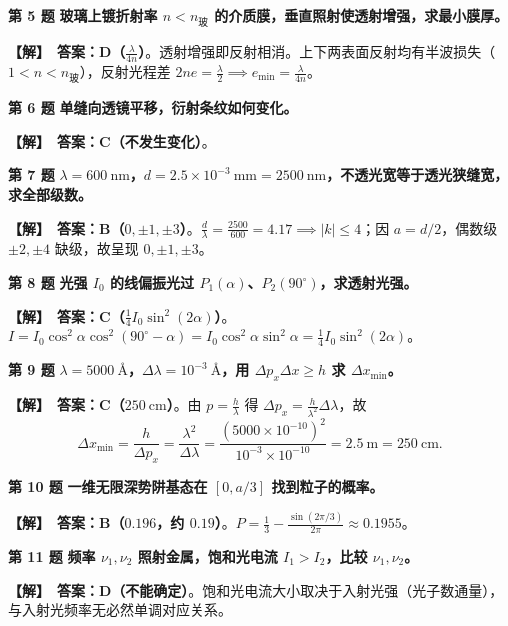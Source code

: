 \documentclass[zihao=5,a4paper,UTF8]{ctexart}
\newenvironment{prob}[2]{%
    \par\vspace{5pt}\noindent\textbf{\color{navy}#1} \textbf{#2}\par\nopagebreak\vspace{2pt}%
}{%
    \par\vspace{3pt}%
}
\newcommand{\sol}{\noindent\textbf{\color{tealaccent}【解】}\ }
\begin{document}
\begin{prob}{第 5 题}{玻璃上镀折射率 $n < n_{\text{玻}}$ 的介质膜，垂直照射使透射增强，求最小膜厚。}
\sol \textbf{答案：D（$\frac{\lambda}{4n}$）}。透射增强即反射相消。上下两表面反射均有半波损失（$1 < n < n_{\text{玻}}$），反射光程差 $2ne = \frac{\lambda}{2} \implies e_{\min} = \frac{\lambda}{4n}$。
\end{prob}

\begin{prob}{第 6 题}{单缝向透镜平移，衍射条纹如何变化。}
\sol \textbf{答案：C（不发生变化）}。
\end{prob}

\begin{prob}{第 7 题}{$\lambda=600\ \mathrm{nm}$，$d=2.5\times 10^{-3}\ \mathrm{mm} = 2500\ \mathrm{nm}$，不透光宽等于透光狭缝宽，求全部级数。}
\sol \textbf{答案：B（$0, \pm 1, \pm 3$）}。$\frac{d}{\lambda} = \frac{2500}{600} = 4.17 \implies |k| \le 4$；因 $a = d/2$，偶数级 $\pm 2, \pm 4$ 缺级，故呈现 $0, \pm 1, \pm 3$。
\end{prob}

\begin{prob}{第 8 题}{光强 $I_0$ 的线偏振光过 $P_1(\alpha)$、$P_2(90^\circ)$，求透射光强。}
\sol \textbf{答案：C（$\frac{1}{4}I_0\sin^2(2\alpha)$）}。$I = I_0\cos^2\alpha\cos^2(90^\circ - \alpha) = I_0\cos^2\alpha\sin^2\alpha = \frac{1}{4}I_0\sin^2(2\alpha)$。
\end{prob}

\begin{prob}{第 9 题}{$\lambda = 5000\ \text{\AA}$，$\Delta\lambda = 10^{-3}\ \text{\AA}$，用 $\Delta p_x \Delta x \ge h$ 求 $\Delta x_{\min}$。}
\sol \textbf{答案：C（$250\ \mathrm{cm}$）}。由 $p = \frac{h}{\lambda}$ 得 $\Delta p_x = \frac{h}{\lambda^2}\Delta\lambda$，故
\[
    \Delta x_{\min} = \frac{h}{\Delta p_x} = \frac{\lambda^2}{\Delta\lambda} = \frac{(5000\times 10^{-10})^2}{10^{-3}\times 10^{-10}} = 2.5\ \mathrm{m} = 250\ \mathrm{cm}.
\]
\end{prob}

\begin{prob}{第 10 题}{一维无限深势阱基态在 $[0, a/3]$ 找到粒子的概率。}
\sol \textbf{答案：B（$0.196$，约 $0.19$）}。$P = \frac{1}{3} - \frac{\sin(2\pi/3)}{2\pi} \approx 0.1955$。
\end{prob}

\begin{prob}{第 11 题}{频率 $\nu_1, \nu_2$ 照射金属，饱和光电流 $I_1 > I_2$，比较 $\nu_1, \nu_2$。}
\sol \textbf{答案：D（不能确定）}。饱和光电流大小取决于入射光强（光子数通量），与入射光频率无必然单调对应关系。
\end{prob}
\end{document}
